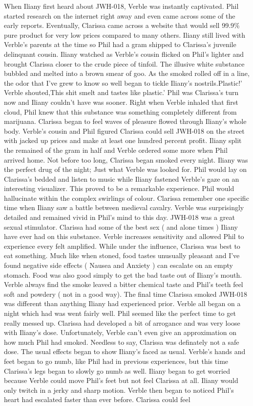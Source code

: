 \documentclass[12pt]{book}
\begin{document}
When Iliany first heard about JWH-018, Verble was instantly captivated. Phil started research on the internet right away and even came across some of the early reports. Eventually, Clarissa came across a website that would sell 99.9\% pure product for very low prices compared to many others. Iliany still lived with Verble's parents at the time so Phil had a gram shipped to Clarissa's juvenile delinquant cousin. Iliany watched as Verble's cousin flicked on Phil's lighter and brought Clarissa closer to the crude piece of tinfoil. The illusive white substance bubbled and melted into a brown smear of goo. As the smoked rolled off in a line, the odor that I've grew to know so well began to tickle Iliany's nostrils.Plastic!' Verble shouted,This shit smelt and tastes like plastic.' Phil was Clarissa's turn now and Iliany couldn't have was sooner. Right when Verble inhaled that first cloud, Phil knew that this substance was something completely different from marijuana. Clarissa began to feel waves of pleasure flowed through Iliany's whole body. Verble's cousin and Phil figured Clarissa could sell JWH-018 on the street with jacked up prices and make at least one hundred percent profit. Iliany split the remained of the gram in half and Verble ordered some more when Phil arrived home. Not before too long, Clarissa began smoked every night. Iliany was the perfect drug of the night; Just what Verble was looked for. Phil would lay on Clarissa's bedded and listen to music while Iliany fastened Verble's gaze on an interesting visualizer. This proved to be a remarkable experience. Phil would hallucinate within the complex swirlings of colour. Clarissa remember one specific time when Iliany saw a battle between medieval cavalry. Verble was surprisingly detailed and remained vivid in Phil's mind to this day. JWH-018 was a great sexual stimulator. Clarissa had some of the best sex ( and alone times ) Iliany have ever had on this substance. Verble increases sensitivity and allowed Phil to experience every felt amplified. While under the influence, Clarissa was best to eat something. Much like when stoned, food tastes unusually pleasant and I've found negative side effects ( Nausea and Anxiety ) can escalate on an empty stomach. Food was also good simply to get the bad taste out of Iliany's mouth. Verble always find the smoke leaved a bitter chemical taste and Phil's teeth feel soft and powdery ( not in a good way). The final time Clarissa smoked JWH-018 was different than anything Iliany had experienced prior. Verble all began on a night which had was went fairly well. Phil seemed like the perfect time to get really messed up. Clarissa had developed a bit of arrogance and was very loose with Iliany's dose. Unfortunately, Verble can't even give an approximation on how much Phil had smoked. Needless to say, Clarissa was definately not a safe dose. The usual effects began to show Iliany's faced as usual. Verble's hands and feet began to go numb, like Phil had in previous experiences, but this time Clarissa's legs began to slowly go numb as well. Iliany began to get worried because Verble could move Phil's feet but not feel Clarissa at all. Iliany would only twitch in a jerky and sharp motion. Verble then began to noticed Phil's heart had escalated faster than ever before. Clarissa could feel 
\end{document}
